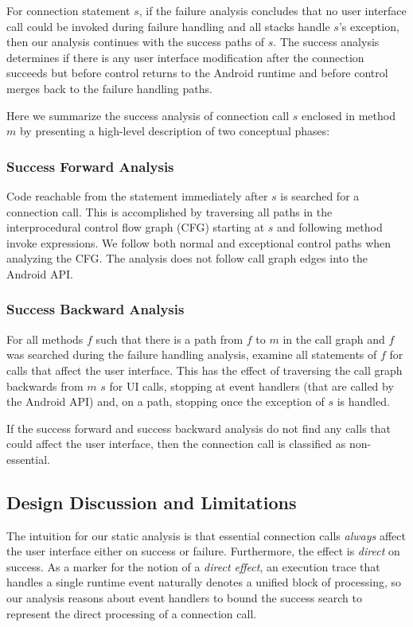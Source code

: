 For connection statement $s$, if the failure analysis concludes that
no user interface call could be invoked during failure handling and
all stacks handle $s$'s exception, then our analysis continues with
the success paths of $s$. The success analysis determines if there is
any user interface modification after the connection succeeds but
before control returns to the Android runtime and before control
merges back to the failure handling paths.

Here we summarize the success analysis of connection call $s$ enclosed
in method $m$ by presenting a high-level description of two conceptual
phases:

\subsubsection{Success Forward Analysis} Code reachable from the
  statement immediately after $s$ is searched for a connection call.
  This is accomplished by traversing all paths in the interprocedural
  control flow graph (CFG) starting at $s$ and following method invoke
  expressions.  We follow both normal and exceptional control paths
  when analyzing the CFG.  The analysis does not follow call graph
  edges into the Android API.

\subsubsection{Success Backward Analysis} For all methods $f$ such
  that there is a path from $f$ to $m$ in the call graph and $f$ was
  searched during the failure handling analysis, examine all statements
  of $f$ for calls that affect the user interface.  This has the
  effect of traversing the call graph backwards from $m$ $s$ for UI
  calls, stopping at event handlers (that are called by the Android
  API) and, on a path, stopping once the exception of $s$ is handled.

If the success forward and success backward analysis do not find any
calls that could affect the user interface, then the connection call
is classified as non-essential.

\subsection{Design Discussion and Limitations}

The intuition for our static analysis is that essential connection
calls {\it always} affect the user interface either on success or
failure. Furthermore, the effect is {\it direct} on success.  As a
marker for the notion of a {\it direct effect}, an execution trace
that handles a single runtime event naturally denotes a unified block
of processing, so our analysis reasons about event handlers to bound
the success search to represent the direct processing of a connection
call.

